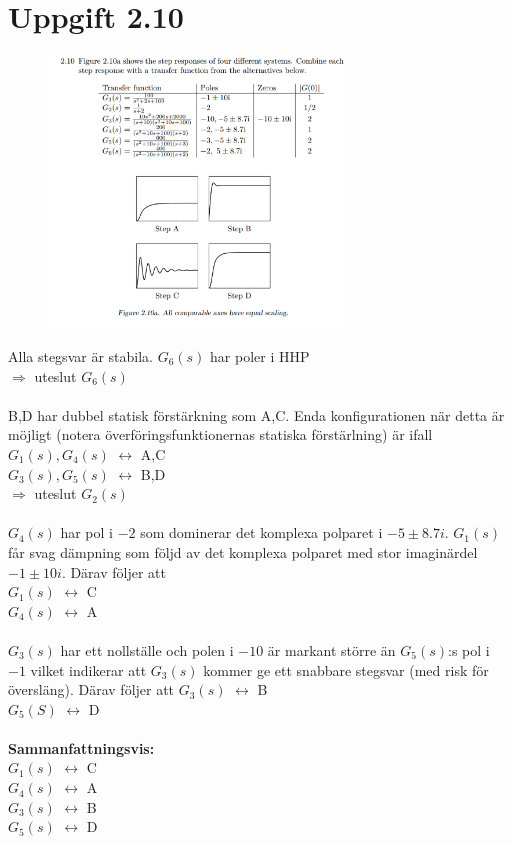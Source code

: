\documentclass[12pt]{article}
\begin{document}
\section*{Uppgift 2.10}
\begin{figure}[h!]
  \centering
  \includegraphics[width=0.7\textwidth]{2_10}
\end{figure}
\FloatBarrier

Alla stegsvar är stabila. $G_6(s)$ har poler i HHP \\
$\Rightarrow$ uteslut $G_6(s)$ \\\\
B,D har dubbel statisk förstärkning som A,C. Enda konfigurationen när detta är möjligt (notera överföringsfunktionernas statiska förstärlning) är ifall \\
$G_1(s), G_4(s)$ $\leftrightarrow$ A,C \\
$G_3(s), G_5(s)$ $\leftrightarrow$ B,D \\
$\Rightarrow$ uteslut $G_2(s)$ \\\\
$G_4(s)$ har pol i $-2$ som dominerar det komplexa polparet i $-5 \pm 8.7i$. $G_1(s)$ får svag dämpning som följd av det komplexa polparet med stor imaginärdel $-1 \pm 10i$. Därav följer att \\
$G_1(s)$ $\leftrightarrow$ C \\
$G_4(s)$ $\leftrightarrow$ A \\\\
$G_3(s)$ har ett nollställe och polen i $-10$ är markant större än $G_5(s)$:s pol i $-1$ vilket indikerar att $G_3(s)$ kommer ge ett snabbare stegsvar (med risk för översläng). Därav följer att
$G_3(s)$ $\leftrightarrow$ B \\
$G_5(S)$ $\leftrightarrow$ D \\\\
\textbf{Sammanfattningsvis:} \\
$G_1(s)$ $\leftrightarrow$ C \\
$G_4(s)$ $\leftrightarrow$ A \\
$G_3(s)$ $\leftrightarrow$ B \\
$G_5(s)$ $\leftrightarrow$ D \\
\end{document}
